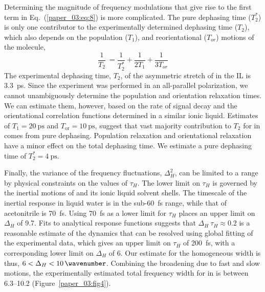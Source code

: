 \documentclass[%
  class = book,%
  crop = false,%
  float = true,%
  multi = true,%
  preview = false,%
]{standalone}
\let\cite\autocite
\begin{document}
Determining the magnitude of frequency modulations that give rise to the first term in Eq.~(\ref{paper_03:eq:8}) is more complicated. The pure dephasing time (\(T_{2}^{*}\)) is only one contributor to the experimentally determined dephasing time (\(T_{2}\)), which also depends on the population (\(T_{1}\)), and reorientational (\(T_{or}\)) motions of the molecule,
\begin{equation}
  \label{paper_03:eq:9}
  \frac{1}{T_{2}}\  = \frac{1}{T_{2}^{*}} + \frac{1}{2T_{1}} + \frac{1}{3T_{or}}
\end{equation}
The experimental dephasing time, \(T_{2}\), of the asymmetric stretch of  in the \ce{[C4C1im][PF6]} IL is \SI{3.3}{\pico\second}.\cite{Brinzer2015} Since the experiment was performed in an all-parallel polarization, we cannot unambiguously determine the population and orientation relaxation times. We can estimate them, however, based on the rate of signal decay and the orientational correlation functions determined in a similar ionic liquid.\cite{Giammanco2016d,Giammanco2016} Estimates of \(T_{1} = \SI{20}{\pico\second}\) and \(T_{\mathrm{or}} = \SI{10}{\pico\second}\), suggest that vast majority contribution to \(T_{2}\) for  in \ce{[C4C1im][PF6]} comes from pure dephasing. Population relaxation and orientational relaxation have a minor effect on the total dephasing time. We estimate a pure dephasing time of \(T_{2}^{*} = \SI{4}{\pico\second}\).

Finally, the variance of the frequency fluctuations, \(\Delta_{H}^{2}\), can be limited to a range by physical constraints on the values of \(\tau_{H}\). The lower limit on \(\tau_{H}\) is governed by the inertial motions of  and its ionic liquid solvent shells. The timescale of the inertial response in liquid water is in the sub-\SI{60}{\femto\second} range, while that of acetonitrile is \SI{70}{\femto\second}.\cite{feckoSci-03,stengerPRL-01,Rosenthal1991} Using \SI{70}{\femto\second} as a lower limit for \(\tau_{H}\) places an upper limit on \(\Delta_{H}\) of \SI{9.7}{\wavenumber}. Fits to analytical response functions suggests that \(\Delta_{H}\ \tau_{H} \approx 0.2\) is a reasonable estimate of the dynamics that can be resolved using global fitting of the experimental data, which gives an upper limit on \(\tau_{H}\) of \SI{200}{\femto\second}, with a corresponding lower limit on \(\Delta_{H}\) of \SI{6}{\wavenumber}. Our estimate for the homogeneous width is thus, \(6 < \Delta_{H} < \SI{10}{\wavenumber}\). Combining the broadening due to fast and slow motions, the experimentally estimated total frequency width for  in \ce{[C4C1im][PF6]} is between \SIrange{6.3}{10.2}{\wavenumber} (Figure~\ref{paper_03:fig4}).
\end{document}
